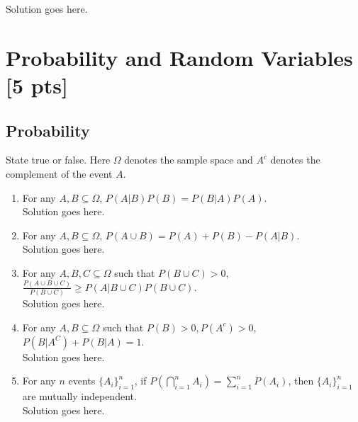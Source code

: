 \documentclass[a4paper]{article}
\theoremstyle{definition}
\newenvironment{soln}{
    \leavevmode\color{blue}\ignorespaces
}{}
\begin{document}
\begin{soln}  Solution goes here. \end{soln}

\section{Probability and Random Variables [5 pts]}
\subsection{Probability}
State true or false. Here $\Omega$ denotes the sample space and $A^c$ denotes the complement of the event $A$.
\begin{enumerate}
\item For any $A, B \subseteq \Omega$, $P(A|B)P(B) = P(B|A)P(A)$.\\
  \begin{soln}  Solution goes here. \end{soln}
\item For any $A, B \subseteq \Omega$, $P(A \cup B) = P(A) + P(B) - P(A | B)$.\\         
  \begin{soln}  Solution goes here. \end{soln}
\item For any $A, B, C \subseteq \Omega$ such that $P(B \cup C) > 0$,
  $\frac{P(A \cup B \cup C)}{P(B \cup C)} \geq P(A | B \cup C) P(B \cup C)$.\\ \begin{soln}  Solution goes here. \end{soln}
\item For any $A, B\subseteq\Omega$ such that $P(B) > 0, P(A^c) > 0$,
  $P(B|A^C) + P(B|A) = 1$.\\ 
  \begin{soln}  Solution goes here. \end{soln}
\item For any $n$ events $\{A_i\}_{i=1}^n$, if
  $P(\bigcap_{i=1}^n A_i) = \sum_{i=1}^n P(A_i)$, then
  $\{A_i\}_{i=1}^n$ are mutually independent.\\
  \begin{soln}  Solution goes here. \end{soln}
\end{enumerate}
\end{document}
